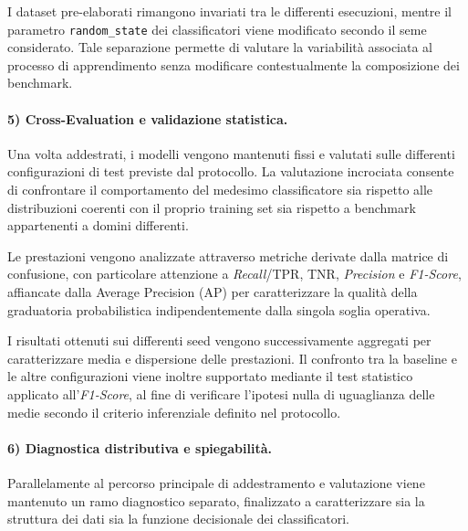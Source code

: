 I dataset pre-elaborati rimangono invariati tra le differenti esecuzioni, mentre il parametro \texttt{random\_state} dei classificatori viene modificato secondo il seme considerato. 
Tale separazione permette di valutare la variabilità associata al processo di apprendimento senza modificare contestualmente la composizione dei benchmark.

\paragraph{5) Cross-Evaluation e validazione statistica.}
Una volta addestrati, i modelli vengono mantenuti fissi e valutati sulle differenti configurazioni di test previste dal protocollo. 
La valutazione incrociata consente di confrontare il comportamento del medesimo classificatore sia rispetto alle distribuzioni coerenti con il proprio training set sia rispetto a benchmark appartenenti a domini differenti.

Le prestazioni vengono analizzate attraverso metriche derivate dalla matrice di confusione, con particolare attenzione a \textit{Recall}/TPR, TNR, \textit{Precision} e \textit{F1-Score}, affiancate dalla Average Precision (AP) per caratterizzare la qualità della graduatoria probabilistica indipendentemente dalla singola soglia operativa.

I risultati ottenuti sui differenti seed vengono successivamente aggregati per caratterizzare media e dispersione delle prestazioni. 
Il confronto tra la baseline e le altre configurazioni viene inoltre supportato mediante il test statistico applicato all'\textit{F1-Score}, al fine di verificare l'ipotesi nulla di uguaglianza delle medie secondo il criterio inferenziale definito nel protocollo.

\paragraph{6) Diagnostica distributiva e spiegabilità.}
Parallelamente al percorso principale di addestramento e valutazione viene mantenuto un ramo diagnostico separato, finalizzato a caratterizzare sia la struttura dei dati sia la funzione decisionale dei classificatori.

